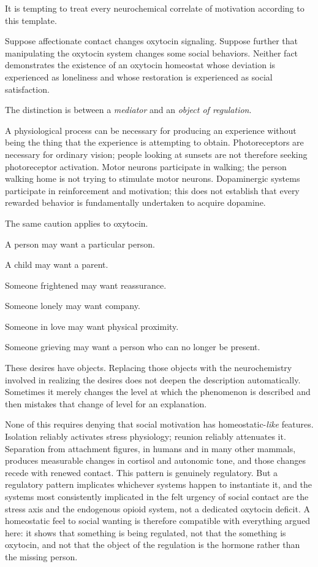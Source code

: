 \documentclass[12pt]{article}
\begin{document}
It is tempting to treat every neurochemical correlate of motivation according to this template.

Suppose affectionate contact changes oxytocin signaling. Suppose further that manipulating the oxytocin system changes some social behaviors. Neither fact demonstrates the existence of an oxytocin homeostat whose deviation is experienced as loneliness and whose restoration is experienced as social satisfaction.

The distinction is between a \emph{mediator} and an \emph{object of regulation}.

A physiological process can be necessary for producing an experience without being the thing that the experience is attempting to obtain. Photoreceptors are necessary for ordinary vision; people looking at sunsets are not therefore seeking photoreceptor activation. Motor neurons participate in walking; the person walking home is not trying to stimulate motor neurons. Dopaminergic systems participate in reinforcement and motivation; this does not establish that every rewarded behavior is fundamentally undertaken to acquire dopamine.

The same caution applies to oxytocin.

A person may want a particular person.

A child may want a parent.

Someone frightened may want reassurance.

Someone lonely may want company.

Someone in love may want physical proximity.

Someone grieving may want a person who can no longer be present.

These desires have objects. Replacing those objects with the neurochemistry involved in realizing the desires does not deepen the description automatically. Sometimes it merely changes the level at which the phenomenon is described and then mistakes that change of level for an explanation.

None of this requires denying that social motivation has homeostatic-\emph{like} features. Isolation reliably activates stress physiology; reunion reliably attenuates it. Separation from attachment figures, in humans and in many other mammals, produces measurable changes in cortisol and autonomic tone, and those changes recede with renewed contact. This pattern is genuinely regulatory. But a regulatory pattern implicates whichever systems happen to instantiate it, and the systems most consistently implicated in the felt urgency of social contact are the stress axis and the endogenous opioid system, not a dedicated oxytocin deficit. A homeostatic feel to social wanting is therefore compatible with everything argued here: it shows that something is being regulated, not that the something is oxytocin, and not that the object of the regulation is the hormone rather than the missing person.
\end{document}

